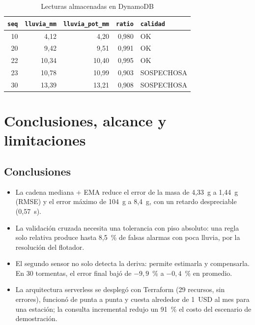 \documentclass[10pt,twocolumn,letterpaper]{article}
\begin{document}
\begin{table}[t]
\caption{Lecturas almacenadas en DynamoDB}
\label{tab:lect}
\centering\footnotesize
\begin{tabular}{@{}rrrrl@{}}
\toprule
\texttt{seq} & \texttt{lluvia\_mm} & \texttt{lluvia\_pot\_mm} & \texttt{ratio} & \texttt{calidad}\\
\midrule
10 & 4,12 & 4,20 & 0,980 & OK\\
20 & 9,42 & 9,51 & 0,991 & OK\\
22 & 10,34 & 10,40 & 0,995 & OK\\
23 & 10,78 & 10,99 & 0,903 & SOSPECHOSA\\
30 & 13,39 & 13,21 & 0,908 & SOSPECHOSA\\
\bottomrule
\end{tabular}
\end{table}


\section{Conclusiones, alcance y limitaciones}
\subsection{Conclusiones}
\begin{itemize}
\item La cadena mediana + EMA reduce el error de la masa de 4,33~g a 1,44~g (RMSE) y el error máximo de 104~g a 8,4~g, con un retardo despreciable (0,57~s).
\item La validación cruzada necesita una tolerancia con piso absoluto: una regla solo relativa produce hasta 8,5~\% de falsas alarmas con poca lluvia, por la resolución del flotador.
\item El segundo sensor no solo detecta la deriva: permite estimarla y compensarla. En 30 tormentas, el error final bajó de $-9{,}9$~\% a $-0{,}4$~\% en promedio.
\item La arquitectura serverless se desplegó con Terraform (29 recursos, sin errores), funcionó de punta a punta y cuesta alrededor de 1~USD al mes para una estación; la consulta incremental redujo un 91~\% el costo del escenario de demostración.
\end{itemize}
\end{document}
